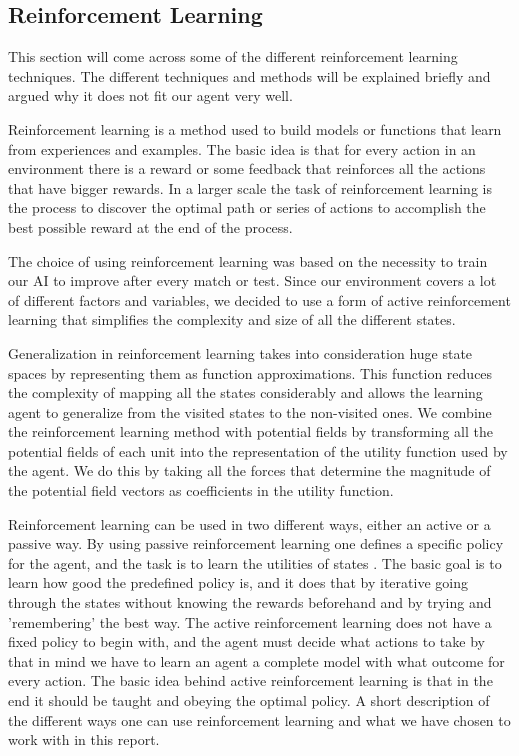 \subsection*{Reinforcement Learning}\label{RL}

This section will come across some of the different reinforcement learning techniques. The different techniques and methods will be explained briefly and argued why it does not fit our agent very well.

	Reinforcement learning is a method used to build models or functions that learn from experiences and examples. The basic idea is that for every action in an environment there is a reward or some feedback that reinforces all the actions that have bigger rewards. In a larger scale the task of reinforcement learning is the process to discover the optimal path or series of actions to accomplish the best possible reward at the end of the process. 

	The choice of using reinforcement learning was based on the necessity to train our AI to improve after every match or test. Since our environment covers a lot of different factors and variables, we decided to use a form of active reinforcement learning that simplifies the complexity and size of all the different states. 

	Generalization in reinforcement learning takes into consideration huge state spaces by representing them as function approximations. This function reduces the complexity of mapping all the states considerably and allows the learning agent to generalize from the visited states to the non-visited ones. We combine the reinforcement learning method with potential fields by transforming all the potential fields of each unit into the representation of the utility function used by the agent. We do this by taking all the forces that determine the magnitude of the potential field vectors as coefficients in the utility function.
	
	
	Reinforcement learning can be used in two different ways, either an active or a passive way. By using passive reinforcement learning one defines a specific policy for the agent, and the task is to learn the utilities of states \cite{rl}. The basic goal is to learn how good the predefined policy is, and it does that by iterative going through the states without knowing the rewards beforehand and by trying and 'remembering' the best way. The active reinforcement learning does not have a fixed policy to begin with, and the agent must decide what actions to take \cite[p771]{rl} by that in mind we have to learn an agent a complete model with what outcome for every action. The basic idea behind active reinforcement learning is that in the end it should be taught and obeying the optimal policy.
A short description of the different ways one can use reinforcement learning and what we have chosen to work with in this report.

